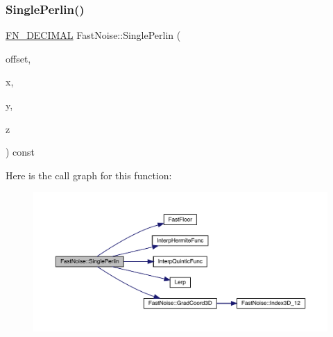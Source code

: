 \subsubsection{\texorpdfstring{Single\+Perlin()}{SinglePerlin()}\hspace{0.1cm}{\footnotesize\ttfamily [2/2]}}
{\footnotesize\ttfamily \mbox{\hyperlink{_fast_noise_8h_a75a9ef6d2541c4921815b885bfd449c3}{F\+N\+\_\+\+D\+E\+C\+I\+M\+AL}} Fast\+Noise\+::\+Single\+Perlin (\begin{DoxyParamCaption}\item[{unsigned char}]{offset,  }\item[{\mbox{\hyperlink{_fast_noise_8h_a75a9ef6d2541c4921815b885bfd449c3}{F\+N\+\_\+\+D\+E\+C\+I\+M\+AL}}}]{x,  }\item[{\mbox{\hyperlink{_fast_noise_8h_a75a9ef6d2541c4921815b885bfd449c3}{F\+N\+\_\+\+D\+E\+C\+I\+M\+AL}}}]{y,  }\item[{\mbox{\hyperlink{_fast_noise_8h_a75a9ef6d2541c4921815b885bfd449c3}{F\+N\+\_\+\+D\+E\+C\+I\+M\+AL}}}]{z }\end{DoxyParamCaption}) const\hspace{0.3cm}{\ttfamily [private]}}

Here is the call graph for this function\+:
\nopagebreak
\begin{figure}[H]
\begin{center}
\leavevmode
\includegraphics[width=350pt]{d1/dd8/class_fast_noise_a93f68e6b4d364be7359076d5c7f19313_cgraph}
\end{center}
\end{figure}
\mbox{\label{class_fast_noise_a7de7c8fe23437c93cc139193e48f3079}} 
